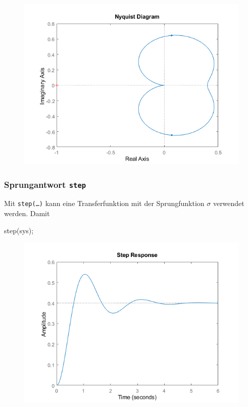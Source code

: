 \documentclass[
  10pt,
  a4paper,
  twocolumn]{article}
\newenvironment{Shaded}{}{}
\newcommand{\NormalTok}[1]{\textcolor[rgb]{0.14,0.16,0.18}{#1}}
\newcommand{\OperatorTok}[1]{\textcolor[rgb]{0.14,0.16,0.18}{#1}}
\newcommand{\VariableTok}[1]{\textcolor[rgb]{0.89,0.38,0.04}{#1}}
\numberwithin{equation}{section}
\begin{document}
\begin{figure}[H]

{\centering \includegraphics{images/matlab_NyquistPlotResponse.png.png}

}

\end{figure}

\hypertarget{sprungantwort-step}{%
\subsubsection{\texorpdfstring{Sprungantwort
\texttt{step}}{Sprungantwort step}}\label{sprungantwort-step}}

Mit \texttt{step(…)} kann eine Transferfunktion mit der Sprungfunktion
\(\sigma\) verwendet werden. Damit

\begin{Shaded}
\begin{Highlighting}[]
\VariableTok{step}\NormalTok{(}\VariableTok{sys}\NormalTok{)}\OperatorTok{;}
\end{Highlighting}
\end{Shaded}

\begin{figure}[H]

{\centering \includegraphics{images/matlab_StepResponsePlot.png}

}

\end{figure}
\end{document}
